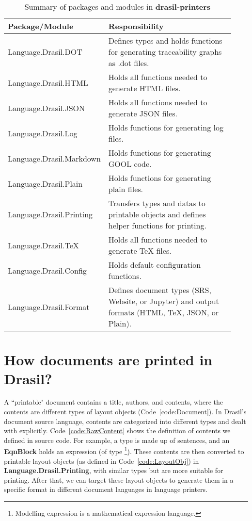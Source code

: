 \begin{longtable}[c]{|>{\raggedright}p{0.32\linewidth}|>{\raggedright\arraybackslash}p{0.61\linewidth}|}
	\caption{Summary of packages and modules in \textbf{drasil-printers}} 
	\label{tab:printerpacks}                                              
	\\ \hline
	
	\rowcolor{McMasterMediumGrey}
	\textbf{Package/Module} & \textbf{Responsibility}
	\\ \hline
	
	Language.Drasil.DOT & Defines types and holds functions for generating 
	traceability graphs as .dot files. 
	\\ \hline
	Language.Drasil.HTML & Holds all functions needed to generate HTML files. 
	\\ \hline
	Language.Drasil.JSON & Holds all functions needed to generate JSON files. 
	\\ \hline
	Language.Drasil.Log & Holds functions for generating log files. 
	\\ \hline
	Language.Drasil.Markdown & Holds functions for generating GOOL code.
	\\ \hline
	Language.Drasil.Plain & Holds functions for generating plain files.
	\\ \hline
	Language.Drasil.Printing & Transfers types and datas to printable objects 
	and defines helper functions for printing.
	\\ \hline
	Language.Drasil.TeX & Holds all functions needed to generate TeX files. 
	\\ \hline
	Language.Drasil.Config & Holds default configuration functions. 
	\\ \hline
	Language.Drasil.Format & Defines document types (SRS, Website, or Jupyter) 
	and output formats (HTML, TeX, JSON, or Plain).
	\\ \hline
\end{longtable}

\section{How documents are printed in Drasil?}
A ``printable" document contains a title, authors, and contents, where the 
contents are different types of layout objects (Code~\ref{code:Document}). In 
Drasil's document source language, contents are categorized into different 
types and dealt with explicitly. Code~\ref{code:RawContent} shows the 
definition of contents we defined in source code. For example, a type 
 is made up of sentences, and an \textbf{EqnBlock} holds an 
expression (of type  \footnote{Modelling expression is a 
mathematical expression language.}). These contents are then converted to 
printable layout objects (as defined in Code~\ref{code:LayoutObj}) in 
\textbf{Language.Drasil.Printing}, with similar types but are more suitable for 
printing. After that, we can target these layout objects to generate them in 
a specific format in different document languages in language printers. 


